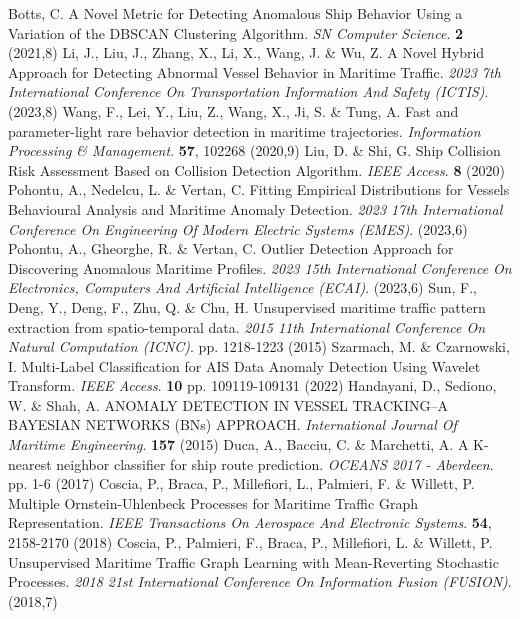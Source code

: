 Botts, C. A Novel Metric for Detecting Anomalous Ship Behavior Using a Variation of the DBSCAN Clustering Algorithm. {\em SN Computer Science}. \textbf{2} (2021,8)
Li, J., Liu, J., Zhang, X., Li, X., Wang, J. \& Wu, Z. A Novel Hybrid Approach for Detecting Abnormal Vessel Behavior in Maritime Traffic. {\em 2023 7th International Conference On Transportation Information And Safety (ICTIS)}. (2023,8)
Wang, F., Lei, Y., Liu, Z., Wang, X., Ji, S. \& Tung, A. Fast and parameter-light rare behavior detection in maritime trajectories. {\em Information Processing \& Management}. \textbf{57}, 102268 (2020,9)
Liu, D. \& Shi, G. Ship Collision Risk Assessment Based on Collision Detection Algorithm. {\em IEEE Access}. \textbf{8} (2020)
Pohontu, A., Nedelcu, L. \& Vertan, C. Fitting Empirical Distributions for Vessels Behavioural Analysis and Maritime Anomaly Detection. {\em 2023 17th International Conference On Engineering Of Modern Electric Systems (EMES)}. (2023,6)
Pohontu, A., Gheorghe, R. \& Vertan, C. Outlier Detection Approach for Discovering Anomalous Maritime Profiles. {\em 2023 15th International Conference On Electronics, Computers And Artificial Intelligence (ECAI)}. (2023,6)
Sun, F., Deng, Y., Deng, F., Zhu, Q. \& Chu, H. Unsupervised maritime traffic pattern extraction from spatio-temporal data. {\em 2015 11th International Conference On Natural Computation (ICNC)}. pp. 1218-1223 (2015)
Szarmach, M. \& Czarnowski, I. Multi-Label Classification for AIS Data Anomaly Detection Using Wavelet Transform. {\em IEEE Access}. \textbf{10} pp. 109119-109131 (2022)
Handayani, D., Sediono, W. \& Shah, A. ANOMALY DETECTION IN VESSEL TRACKING–A BAYESIAN NETWORKS (BNs) APPROACH. {\em International Journal Of Maritime Engineering}. \textbf{157} (2015)
Duca, A., Bacciu, C. \& Marchetti, A. A K-nearest neighbor classifier for ship route prediction. {\em OCEANS 2017 - Aberdeen}. pp. 1-6 (2017)
Coscia, P., Braca, P., Millefiori, L., Palmieri, F. \& Willett, P. Multiple Ornstein-Uhlenbeck Processes for Maritime Traffic Graph Representation. {\em IEEE Transactions On Aerospace And Electronic Systems}. \textbf{54}, 2158-2170 (2018)
Coscia, P., Palmieri, F., Braca, P., Millefiori, L. \& Willett, P. Unsupervised Maritime Traffic Graph Learning with Mean-Reverting Stochastic Processes. {\em 2018 21st International Conference On Information Fusion (FUSION)}. (2018,7)
